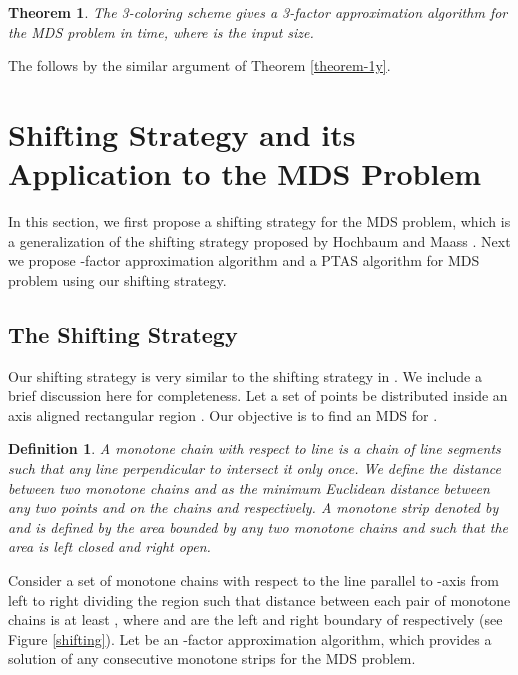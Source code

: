 \documentclass[a4paper,11pt]{article}
\newtheorem{theorem}{Theorem}
\newtheorem{definition}{Definition}
\newenvironment{proof}{\noindent {\bf Proof:\,\ }}{\hfill\mbox{\
}\smallskip}
\begin{document}
\begin{theorem} \label{theorem-2y}
 The 3-coloring scheme gives a 3-factor approximation algorithm for the MDS problem in 
  time, where  is the input size.
\end{theorem}

\begin{proof}
The follows by the similar argument of Theorem \ref{theorem-1y}.   
\end{proof}

\section{Shifting Strategy and its Application to the MDS Problem} \label{ShiftingStrategy}
In this section, we first propose a shifting strategy for the MDS problem, which is 
a generalization of the shifting strategy proposed by Hochbaum and Maass \cite{HM85}. Next we propose 
-factor approximation algorithm and a PTAS algorithm for MDS problem using our shifting strategy.  

\subsection{The Shifting Strategy} \label{shifting-strategy}
Our shifting strategy is very similar to the shifting strategy in \cite{HM85}. We include a brief 
discussion here for completeness. Let a set  of  points be distributed inside an axis aligned 
rectangular region . Our objective is to find an MDS for . 

\begin{definition}
A {\it monotone chain}  with respect to line  is a chain of line segments 
such that any line perpendicular to  intersect it only once. We define the distance between two 
monotone chains  and  as the minimum Euclidean distance between any two points  and  
on the chains  and  respectively. A {\it monotone strip} denoted by  and is defined by the 
area bounded by any two monotone chains  and  such that the area is left closed and 
right open.
\end{definition}

Consider a set  of  monotone chains with respect to the line parallel to -axis 
from left to right dividing the region  such that distance between each pair of monotone chains is 
at least , where  and  are the left and right boundary of  respectively 
(see Figure \ref{shifting}). Let  be an -factor approximation algorithm, which provides a 
solution of any  consecutive monotone strips for the MDS problem. 
\end{document}
